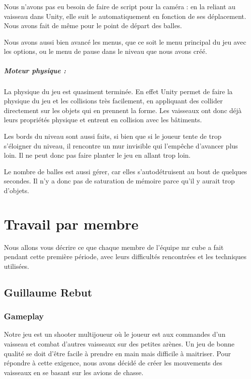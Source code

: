 \documentclass[10pt, titlepage]{report}
\begin{document}
 Nous n'avons pas eu besoin de faire de script pour la caméra : en la reliant au vaisseau dans Unity, elle suit le automatiquement en fonction de ses déplacement. Nous avons fait de même pour le point de départ des balles.

 Nous avons aussi bien avancé les menus, que ce soit le menu principal du jeu avec les options, ou le menu de pause dans le niveau que nous avons créé.

\paragraph{Moteur physique :}
La physique du jeu est quasiment terminée. En effet Unity permet de faire la physique du jeu et les collisions très facilement, en appliquant des collider directement sur les objets qui en prennent la forme. Les vaisseaux ont donc déjà leurs propriétés physique et entrent en collision avec les bâtiments.

 Les bords du niveau sont aussi faits, si bien que si le joueur tente de trop s'éloigner du niveau, il rencontre un mur invisible qui l'empêche d'avancer plus loin. Il ne peut donc pas faire planter le jeu en allant trop loin. 

Le nombre de balles est aussi gérer, car elles s'autodétruisent au bout de quelques secondes. Il n'y a donc pas de saturation de mémoire parce qu'il y aurait trop d'objets.

\chapter{Travail par membre}
Nous allons vous décrire ce que chaque membre de l'équipe mr cube a fait pendant cette première période, avec leurs difficultés rencontrées et les techniques utilisées.

\section{Guillaume Rebut}

\subsection{Gameplay}

Notre jeu est un shooter multijoueur où le joueur est aux commandes d'un vaisseau et combat d'autres vaisseaux sur des petites arènes. Un jeu de bonne qualité se doit d'être facile à prendre en main mais difficile à maitriser. Pour répondre à cette exigence, nous avons décidé de créer les mouvements des vaisseaux en se basant sur les avions de chasse.\\
\end{document}
